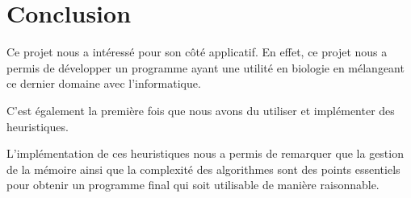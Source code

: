 
\section{Conclusion}

Ce projet nous a intéressé pour son côté applicatif. En effet, ce projet nous a
permis de développer un programme ayant une utilité en biologie en mélangeant
ce dernier domaine avec l'informatique.

C'est également la première fois que nous avons du utiliser et implémenter des
heuristiques.

L'implémentation de ces heuristiques nous a permis de remarquer que la gestion
de la mémoire ainsi que la complexité des algorithmes sont des points essentiels
pour obtenir un programme final qui soit utilisable de manière raisonnable.

